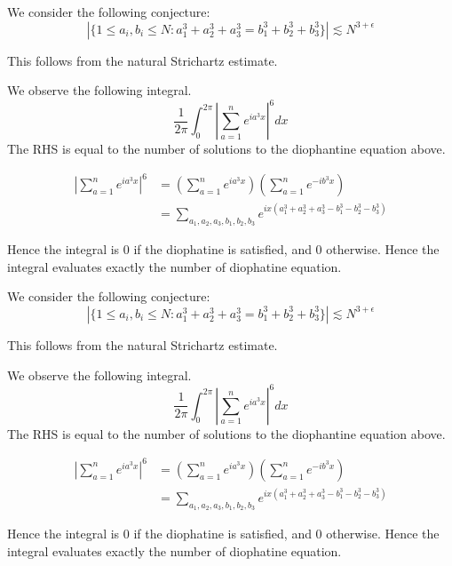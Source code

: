 We consider the following conjecture:
\begin{equation*}
    |\{1\leq a_i, b_i\leq N: a_1^3+a_2^3+a_3^3=b_1^3+b_2^3+b_3^3\}|\lesssim N^{3+\epsilon}
\end{equation*}

This follows from the natural Strichartz estimate. 

We observe the following integral.
\begin{equation*}
    \frac{1}{2\pi}\int_0^{2\pi}\left|\sum_{a=1}^ne^{ia^3x}\right|^6dx
\end{equation*}
The RHS is equal to the number of solutions to the diophantine equation above.

\begin{align*}
    \left|\sum_{a=1}^ne^{ia^3x}\right|^6&=(\sum_{a=1}^ne^{ia^3x})(\sum_{a=1}^ne^{-ib^3x})\\
    &=\sum_{a_1, a_2, a_3, b_1, b_2, b_3}e^{ix(a_1^3+a_2^3+a_3^3-b_1^3-b_2^3-b_3^3)}
\end{align*}

Hence the integral is 0 if the diophatine is satisfied, and 0 otherwise. Hence the integral evaluates exactly the number of diophatine equation. 

We consider the following conjecture:
\begin{equation*}
    |\{1\leq a_i, b_i\leq N: a_1^3+a_2^3+a_3^3=b_1^3+b_2^3+b_3^3\}|\lesssim N^{3+\epsilon}
\end{equation*}

This follows from the natural Strichartz estimate. 

We observe the following integral.
\begin{equation*}
    \frac{1}{2\pi}\int_0^{2\pi}\left|\sum_{a=1}^ne^{ia^3x}\right|^6dx
\end{equation*}
The RHS is equal to the number of solutions to the diophantine equation above.

\begin{align*}
    \left|\sum_{a=1}^ne^{ia^3x}\right|^6&=(\sum_{a=1}^ne^{ia^3x})(\sum_{a=1}^ne^{-ib^3x})\\
    &=\sum_{a_1, a_2, a_3, b_1, b_2, b_3}e^{ix(a_1^3+a_2^3+a_3^3-b_1^3-b_2^3-b_3^3)}
\end{align*}

Hence the integral is 0 if the diophatine is satisfied, and 0 otherwise. Hence the integral evaluates exactly the number of diophatine equation. 

